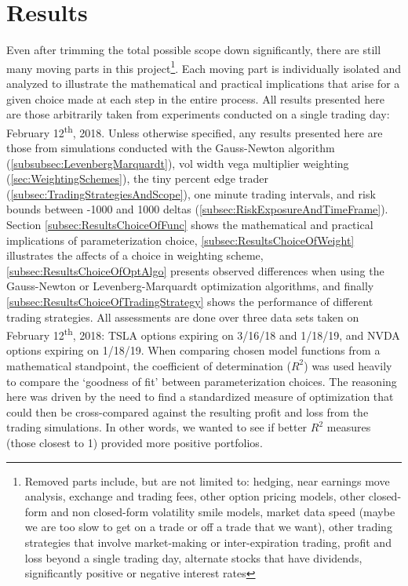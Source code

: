 \documentclass[12pt, a4paper, notitlepage]{article}
\numberwithin{equation}{subsection}
\numberwithin{figure}{subsection}
\numberwithin{table}{subsection}
\newcommand{\newpar}{\newline \newline}
\begin{document}
\section{Results} \label{sec:Results}
Even after trimming the total possible scope down significantly, there are still many moving parts in this project\footnote{Removed parts include, but are not limited to:  hedging, near earnings move analysis, exchange and trading fees, other option pricing models, other closed-form and non closed-form volatility smile models, market data speed (maybe we are too slow to get on a trade or off a trade that we want), other trading strategies that involve market-making or inter-expiration trading, profit and loss beyond a single trading day, alternate stocks that have dividends, significantly positive or negative interest rates}.  Each moving part is individually isolated and analyzed to illustrate the mathematical and practical implications that arise for a given choice made at each step in the entire process.  All results presented here are those arbitrarily taken from experiments conducted on a single trading day:  February 12\textsuperscript{th}, 2018.
\newpar
Unless otherwise specified, any results presented here are those from simulations conducted with the Gauss-Newton algorithm (\ref{subsubsec:LevenbergMarquardt}), vol width vega multiplier weighting (\ref{sec:WeightingSchemes}), the tiny percent edge trader (\ref{subsec:TradingStrategiesAndScope}), one minute trading intervals, and risk bounds between -1000 and 1000 deltas (\ref{subsec:RiskExposureAndTimeFrame}).
\newpar
Section \ref{subsec:ResultsChoiceOfFunc} shows the mathematical and practical implications of parameterization choice, \ref{subsec:ResultsChoiceOfWeight} illustrates the affects of a choice in weighting scheme, \ref{subsec:ResultsChoiceOfOptAlgo} presents observed differences when using the Gauss-Newton or Levenberg-Marquardt optimization algorithms, and finally \ref{subsec:ResultsChoiceOfTradingStrategy} shows the performance of different trading strategies.  All assessments are done over three data sets taken on February 12\textsuperscript{th}, 2018:  TSLA options expiring on 3/16/18 and 1/18/19, and NVDA options expiring on 1/18/19.
\newpar
When comparing chosen model functions from a mathematical standpoint, the coefficient of determination ($R^2$) was used heavily to compare the `goodness of fit' between parameterization choices.  The reasoning here was driven by the need to find a standardized measure of optimization that could then be cross-compared against the resulting profit and loss from the trading simulations.  In other words, we wanted to see if better $R^2$ measures (those closest to 1) provided more positive portfolios.
\end{document}
